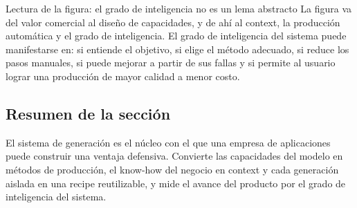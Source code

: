 \begin{knowledgebox}{Lectura de la figura: el grado de inteligencia no es un lema abstracto}
La figura va del valor comercial al diseño de capacidades, y de ahí al context, la producción automática y el grado de inteligencia. El grado de inteligencia del sistema puede manifestarse en: si entiende el objetivo, si elige el método adecuado, si reduce los pasos manuales, si puede mejorar a partir de sus fallas y si permite al usuario lograr una producción de mayor calidad a menor costo.
\end{knowledgebox}

\subsection{Resumen de la sección}

El sistema de generación es el núcleo con el que una empresa de aplicaciones puede construir una ventaja defensiva. Convierte las capacidades del modelo en métodos de producción, el know-how del negocio en context y cada generación aislada en una recipe reutilizable, y mide el avance del producto por el grado de inteligencia del sistema.
